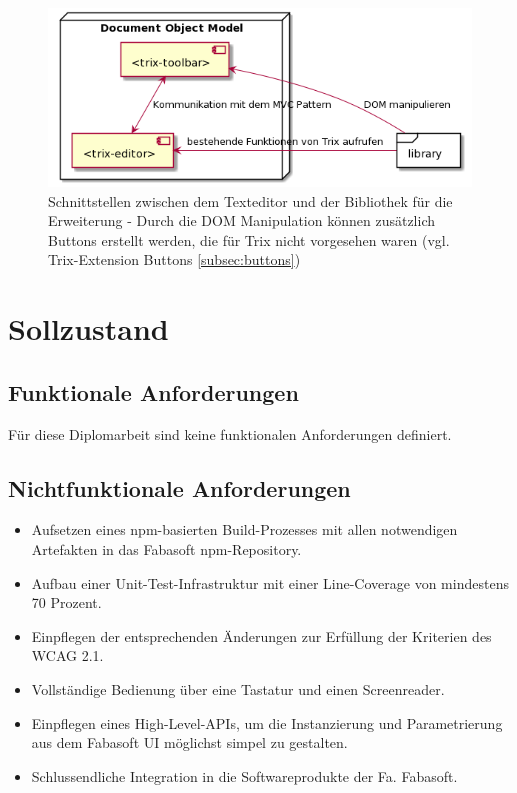 \begin{figure}[H]
\begin{center}
	\includegraphics[scale=.6]{images/trix-extension_components.png}
\end{center}
	\caption{Schnittstellen zwischen dem Texteditor und der Bibliothek für die Erweiterung - Durch die DOM Manipulation können zusätzlich Buttons erstellt werden, die für Trix nicht vorgesehen waren (vgl. Trix-Extension Buttons \ref{subsec:buttons})}
\end{figure}

\section{Sollzustand}

\subsection{Funktionale Anforderungen}
Für diese Diplomarbeit sind keine funktionalen Anforderungen definiert.

\subsection{Nichtfunktionale Anforderungen}

\begin{itemize}
	\item Aufsetzen eines npm-basierten Build-Prozesses mit allen notwendigen Artefakten in das Fabasoft npm-Repository.
	\item Aufbau einer Unit-Test-Infrastruktur mit einer Line-Coverage von mindestens 70 Prozent.
	\item Einpflegen der entsprechenden Änderungen zur Erfüllung der Kriterien des WCAG 2.1.
	\item Vollständige Bedienung über eine Tastatur und einen Screenreader.
	\item Einpflegen eines High-Level-APIs, um die Instanzierung und Parametrierung aus dem Fabasoft UI möglichst simpel zu gestalten.
	\item Schlussendliche Integration in die Softwareprodukte der Fa. Fabasoft.
\end{itemize}

